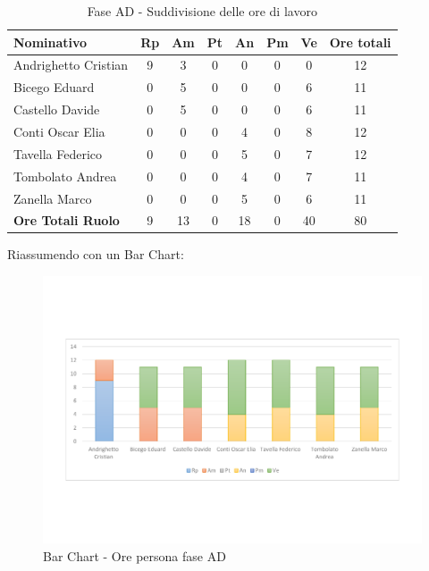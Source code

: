 \documentclass[../PianoProgetto.tex]{subfiles}
\begin{document}
	\begin{table}[h]
		\begin{tabularx}{\textwidth}{l  * {6}{C}  c}
			\toprule
			\textbf{Nominativo} & \textbf{Rp} & \textbf{Am} & \textbf{Pt} 
						& \textbf{An} & \textbf{Pm} & \textbf{Ve} & \textbf{Ore totali} \\
			\midrule
			Andrighetto Cristian & 9 & 3 &	0 &	0 & 0 & 0 & 12 \\
			Bicego Eduard & 0 & 5 & 0 & 0 & 0 & 6 & 11 \\
			Castello Davide & 0 & 5 & 0 & 0 & 0 & 6 & 11 \\
			Conti Oscar Elia & 0 & 0 &	0 &	4 & 0 & 8 & 12 \\
			Tavella Federico &	0 & 0 & 0 & 5 & 0 & 7 & 12 \\
			Tombolato Andrea & 0 & 0 &	0 &	4 & 0 & 7 & 11 \\
			Zanella Marco & 0 & 0 & 0 & 5 & 0 & 6 & 11 \\
			\midrule			
			\textbf{Ore Totali Ruolo} & 9 & 13 & 0 & 18 & 0 & 40 & 80 \\
			\bottomrule
		\end{tabularx}	
		\caption{Fase AD - Suddivisione delle ore di lavoro}
		\label{tab:faseAD_ore}	
	\end{table}
\vfill
\newpage
\vfill
	Riassumendo con un Bar Chart:
	
	\begin{figure}[!h]
		\centering
		\includegraphics[width=\textwidth , trim=2cm 5cm 2cm 5cm]{grafici/AD/AD-ore-persona}
			\caption{Bar Chart - Ore persona fase AD}
		\label{fig:BarChart-faseAD_ore}
	\end{figure}
	
\end{document}
